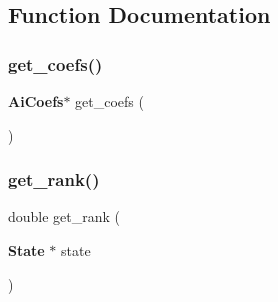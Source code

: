 \subsection{Function Documentation}
\mbox{\label{engine_8c_aa3954072faa56eb56911abf3b27ea25e}} 
\subsubsection{get\+\_\+coefs()}
{\footnotesize\ttfamily \textbf{ Ai\+Coefs}$\ast$ get\+\_\+coefs (\begin{DoxyParamCaption}{ }\end{DoxyParamCaption})}

\mbox{\label{engine_8c_ac881f0868dfdb55b606f2288c56e4430}} 
\subsubsection{get\+\_\+rank()}
{\footnotesize\ttfamily double get\+\_\+rank (\begin{DoxyParamCaption}\item[{\textbf{ State} $\ast$}]{state }\end{DoxyParamCaption})}

